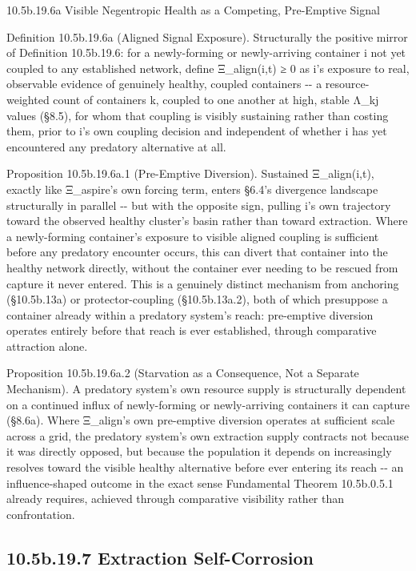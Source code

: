 \documentclass[
]{article}
\begin{document}
10.5b.19.6a Visible Negentropic Health as a Competing, Pre-Emptive
Signal

Definition 10.5b.19.6a (Aligned Signal Exposure). Structurally the
positive mirror of Definition 10.5b.19.6: for a newly-forming or
newly-arriving container i not yet coupled to any established network,
define Ξ\_align(i,t) ≥ 0 as i's exposure to real, observable evidence of
genuinely healthy, coupled containers -\/- a resource-weighted count of
containers k, coupled to one another at high, stable Λ\_kj values
(§8.5), for whom that coupling is visibly sustaining rather than costing
them, prior to i's own coupling decision and independent of whether i
has yet encountered any predatory alternative at all.

Proposition 10.5b.19.6a.1 (Pre-Emptive Diversion). Sustained
Ξ\_align(i,t), exactly like Ξ\_aspire's own forcing term, enters §6.4's
divergence landscape structurally in parallel -\/- but with the opposite
sign, pulling i's own trajectory toward the observed healthy cluster's
basin rather than toward extraction. Where a newly-forming container's
exposure to visible aligned coupling is sufficient before any predatory
encounter occurs, this can divert that container into the healthy
network directly, without the container ever needing to be rescued from
capture it never entered. This is a genuinely distinct mechanism from
anchoring (§10.5b.13a) or protector-coupling (§10.5b.13a.2), both of
which presuppose a container already within a predatory system's reach:
pre-emptive diversion operates entirely before that reach is ever
established, through comparative attraction alone.

Proposition 10.5b.19.6a.2 (Starvation as a Consequence, Not a Separate
Mechanism). A predatory system's own resource supply is structurally
dependent on a continued influx of newly-forming or newly-arriving
containers it can capture (§8.6a). Where Ξ\_align's own pre-emptive
diversion operates at sufficient scale across a grid, the predatory
system's own extraction supply contracts not because it was directly
opposed, but because the population it depends on increasingly resolves
toward the visible healthy alternative before ever entering its reach
-\/- an influence-shaped outcome in the exact sense Fundamental Theorem
10.5b.0.5.1 already requires, achieved through comparative visibility
rather than confrontation.

\hypertarget{b.19.7-extraction-self-corrosion}{%
\subsection{10.5b.19.7 Extraction
Self-Corrosion}\label{b.19.7-extraction-self-corrosion}}
\end{document}

